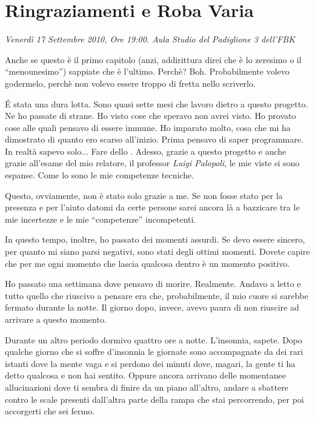 \chapter*{Ringraziamenti e Roba Varia}
\label{chap:Thanks}

\emph{Venerdì 17 Settembre 2010, Ore 19:00. Aula Studio del Padiglione 3
dell'FBK}

Anche se questo è il primo capitolo (anzi, addirittura direi che è lo
zeresimo o il ``menounesimo'') sappiate che è l'ultimo. Perchè? Boh.
Probabilmente volevo godermelo, perchè non volevo essere troppo di fretta
nello scriverlo.

\'E stata una dura lotta. Sono quasi sette mesi che lavoro dietro a questo
progetto. Ne ho passate di strane. Ho visto cose che speravo non avrei
visto. Ho provato cose alle quali pensavo di essere immune. Ho imparato
molto, cosa che mi ha dimostrato di quanto ero scarso all'inizio. Prima
pensavo di saper programmare. In realtà sapevo solo... Fare dello
. Adesso, grazie a questo progetto e anche grazie
all'esame  del mio relatore, il
professor \emph{Luigi Palopoli}, le mie viste si sono espanse. Come lo sono
le mie competenze tecniche.

Questo, ovviamente, non è stato solo grazie a me. Se non fosse stato per la
presenza e per l'aiuto datomi da certe persone sarei ancora là a bazzicare
tra le mie incertezze e le mie ``competenze'' incompetenti.

In questo tempo, inoltre, ho passato dei momenti assurdi. Se devo essere
sincero, per quanto mi siano parsi negativi, sono stati degli ottimi
momenti. Dovete capire che per me ogni momento che lascia qualcosa dentro è
un momento positivo. 

Ho passato una settimana dove pensavo di morire. Realmente. Andavo a letto
e tutto quello che riuscivo a pensare era che, probabilmente, il mio cuore
si sarebbe fermato durante la notte. Il giorno dopo, invece, avevo paura
di non riuscire ad arrivare a questo momento.

Durante un altro periodo dormivo quattro ore a notte. L'insonnia, sapete.
Dopo qualche giorno che si soffre d'insonnia le giornate sono accompagnate
da dei rari istanti dove la mente vaga e si perdono dei minuti dove,
magari, la gente ti ha detto qualcosa e non hai sentito. Oppure ancora
arrivano delle momentanee allucinazioni dove ti sembra di finire da un
piano all'altro, andare a sbattere contro le scale presenti dall'altra
parte della rampa che stai percorrendo, per poi accorgerti che sei fermo.

